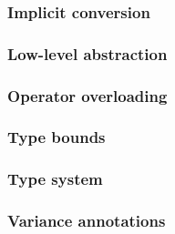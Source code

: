 \subsubsection{Implicit conversion}
\subsubsection{Low-level abstraction}
\subsubsection{Operator overloading}
\subsubsection{Type bounds}
\subsubsection{Type system}
\subsubsection{Variance annotations}